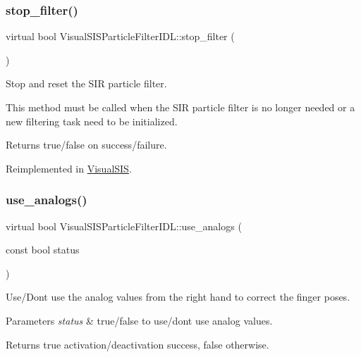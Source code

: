 \subsubsection{\texorpdfstring{stop\+\_\+filter()}{stop\_filter()}}
{\footnotesize\ttfamily virtual bool Visual\+S\+I\+S\+Particle\+Filter\+I\+D\+L\+::stop\+\_\+filter (\begin{DoxyParamCaption}{ }\end{DoxyParamCaption})\hspace{0.3cm}{\ttfamily [virtual]}}



Stop and reset the S\+IR particle filter. 

This method must be called when the S\+IR particle filter is no longer needed or a new filtering task need to be initialized. \begin{DoxyReturn}{Returns}
true/false on success/failure. 
\end{DoxyReturn}


Reimplemented in \hyperlink{classVisualSIS_a8e111a001d0dd201a5f661c9ff226bc1}{Visual\+S\+IS}.

\mbox{\label{classVisualSISParticleFilterIDL_a4fee3e1fbc6676767f99c8b552434709}} 
\subsubsection{\texorpdfstring{use\+\_\+analogs()}{use\_analogs()}}
{\footnotesize\ttfamily virtual bool Visual\+S\+I\+S\+Particle\+Filter\+I\+D\+L\+::use\+\_\+analogs (\begin{DoxyParamCaption}\item[{const bool}]{status }\end{DoxyParamCaption})\hspace{0.3cm}{\ttfamily [virtual]}}



Use/\+Don\textquotesingle{}t use the analog values from the right hand to correct the finger poses. 


\begin{DoxyParams}{Parameters}
{\em status} & true/false to use/don\textquotesingle{}t use analog values. \\
\hline
\end{DoxyParams}
\begin{DoxyReturn}{Returns}
true activation/deactivation success, false otherwise. 
\end{DoxyReturn}


